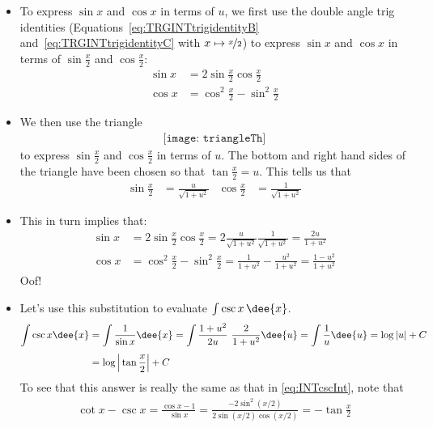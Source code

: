 \begin{eg}[$\int \csc x\dee{x}$ --- by the $u=\tan\frac{x}{2}$ substitution]
\begin{itemize}
\item To express $\sin x$ and $\cos x$ in terms of $u$, we first use the double angle
trig identities (Equations~\ref{eq:TRGINTtrigidentityB} and~\ref{eq:TRGINTtrigidentityC}
with $x \mapsto \nicefrac{x}{2}$) to express $\sin x$ and $\cos x$ in terms of
$\sin\frac{x}{2}$ and $\cos\frac{x}{2}$:
\begin{align*}
\sin x &= 2 \sin\frac{x}{2} \cos\frac{x}{2} \\
\cos x &= \cos^2 \frac{x}{2} - \sin^2\frac{x}{2}
\end{align*}
\item We then use the triangle
\begin{align*}
\texttt{[image: triangleTh]}
\end{align*}
to express $\sin\frac{x}{2}$ and $\cos\frac{x}{2}$ in terms of $u$. The bottom and right
hand sides of the triangle have been chosen so that $\tan\frac{x}{2}=u$. This tells us
that
\begin{align*}
  \sin \frac{x}{2} &= \frac{u}{\sqrt{1+u^2}}
& \cos \frac{x}{2} &= \frac{1}{\sqrt{1+u^2}}
\end{align*}
\item This in turn implies that:
\begin{align*}
\sin x&=2\sin\frac{x}{2}\cos\frac{x}{2}
=2\frac{u}{\sqrt{1+u^2}}\frac{1}{\sqrt{1+u^2}}
=\frac{2u}{1+u^2}
\\
\cos x&=\cos^2\frac{x}{2}-\sin^2\frac{x}{2}
=\frac{1}{1+u^2}-\frac{u^2}{1+u^2}
=\frac{1-u^2}{1+u^2}
\end{align*}
Oof!
\item
Let's use this substitution to evaluate $\int \csc x\,\dee{x}$.
\begin{align*}
\int \csc x\dee{x}
&=\int \frac{1}{\sin x}\dee{x}
=\int \frac{1+u^2}{2u}\ \frac{2}{1+u^2}\dee{u}
=\int \frac{1}{u}\dee{u}
=\log|u|+C \\[0.05in]
&=\log\Big|\tan\frac{x}{2}\Big|+C
\end{align*}
To see that this answer is really the same as that in \eqref{eq:INTcscInt},
note that
\begin{align*}
\cot x-\csc x
=\frac{\cos x-1}{\sin x}
=\frac{-2\sin^2(x/2)}{2\sin(x/2)\cos(x/2)}
=-\tan\frac{x}{2}
\end{align*}
\end{itemize}
\end{eg}
